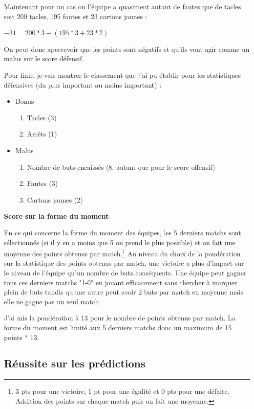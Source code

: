 \documentclass[a4paper,14pt]{extarticle}
\begin{document}
{Maintenant pour un cas ou l'équipe a quasiment autant de fautes que de tacles soit 200 tacles, 195 fautes et 23 cartons jaunes : 

$-31 = 200 * 3 - (195 * 3 + 23 * 2)$

On peut donc apercevoir que les points sont négatifs et qu'ils vont agir comme un malus sur le score défensif.

Pour finir, je vais montrer le classement que j'ai pu établir pour les statistiques défensives (du plus important au moins important) :
\begin{itemize}
    \item Bonus
    \begin{enumerate}
        \item Tacles (3)
        \item Arrêts (1)
    \end{enumerate}
    \item Malus
    \begin{enumerate}
        \item Nombre de buts encaissés (8, autant que pour le score offensif)
        \item Fautes (3)
        \item Cartons jaunes (2)
    \end{enumerate}
\end{itemize}

\noindent\textbf{Score sur la forme du moment}

En ce qui concerne la forme du moment des équipes, les 5 derniers matchs sont sélectionnés (si il y en a moins que 5 on prend le plus possible) et on fait une moyenne des points obtenus par match.\footnote{3 pts pour une victoire, 1 pt pour une égalité et 0 pts pour une défaite. Addition des points sur chaque match puis on fait une moyenne.} 
Au niveau du choix de la pondération sur la statistique des points obtenus par match, une victoire a plus d'impact sur le niveau de l'équipe qu'un nombre de buts conséquents. Une équipe peut gagner tous ces derniers matchs "1-0" en jouant efficacement sans chercher à marquer plein de buts tandis qu'une autre peut avoir 2 buts par match en moyenne mais elle ne gagne pas un seul match.

J'ai mis la pondération à 13 pour le nombre de points obtenus par match. La forme du moment est limité aux 5 derniers matchs donc un maximum de 15 points * 13.

\subsection{Réussite sur les prédictions}
\label{test_pourcent_reussite}

}
\end{document}
